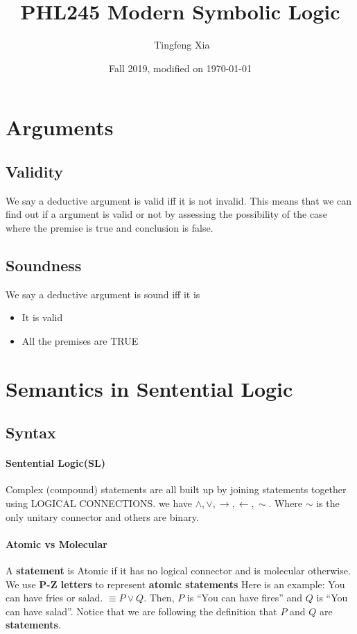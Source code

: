 \documentclass[10pt]{article}
\title{PHL245 Modern Symbolic Logic}
\author{\ccLogo \,\,Tingfeng Xia}
\date{Fall 2019, modified on \today}
\begin{document}
\maketitle
\doclicenseThis
\tableofcontents
\newpage

\section{Arguments}
\subsection{Validity}
We say a deductive argument is valid iff it is not invalid. This means that we can
find out if a argument is valid or not by assessing the possibility of the case where 
the premise is true and conclusion is false.
\subsection{Soundness}
We say a deductive argument is sound iff it is 
\begin{itemize}
    \item It is valid
    \item All the premises are TRUE
\end{itemize}

\section{Semantics in Sentential Logic}
\subsection{Syntax}
\paragraph{Sentential Logic(SL)} Complex (compound) statements are all built up by joining statements together using LOGICAL CONNECTIONS.
we have $\wedge, \vee, \rightarrow, \leftarrow, \sim$. Where $\sim$ is the only unitary connector and others are binary.

\paragraph{Atomic vs Molecular} A \textbf{statement} is Atomic if it has no logical connector and is molecular otherwise. We use \textbf{P-Z letters} to represent \textbf{atomic statements}
Here is an example: You can have fries or salad. $\equiv P \vee Q.$ Then, $P$ is ``You can have fires'' and $Q$ is ``You can have salad''. Notice that we are following the definition that $P$ and $Q$ are \textbf{statements}.
\end{document}
